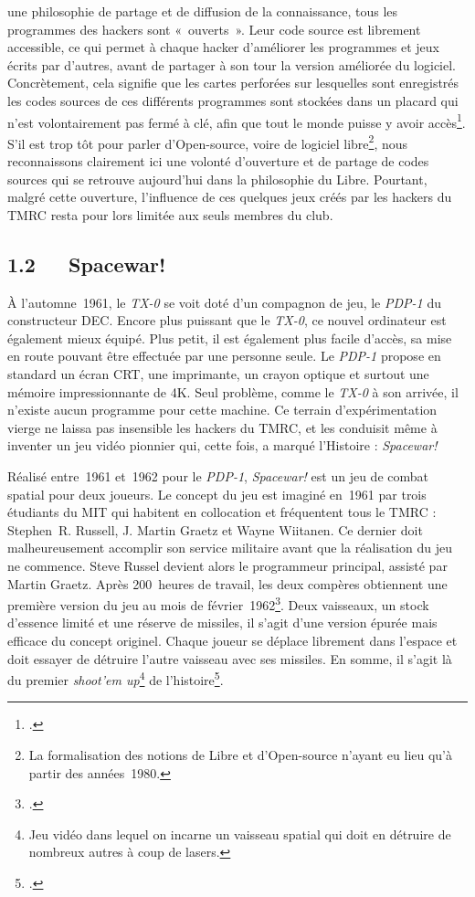 \documentclass{FramateX}
\begin{document}
\begin{refsection}
une philosophie de partage et de diffusion de la connaissance, tous les
programmes des hackers sont «~ouverts~». Leur code source est librement
accessible, ce qui permet à chaque hacker d'améliorer les programmes et
jeux écrits par d'autres, avant de partager à son tour la version
améliorée du logiciel. Concrètement, cela signifie que les cartes
perforées sur lesquelles sont enregistrés les codes sources de ces
différents programmes sont stockées dans un placard qui n'est
volontairement pas fermé à clé, afin que tout le monde puisse y avoir
accès\footnote{\cite{graetzorigin1981}.}. S'il est trop tôt pour parler d'Open-source,
voire de logiciel libre\footnote{La formalisation des notions de
Libre et d'Open-source n'ayant eu lieu qu'à partir des années~1980.},
nous reconnaissons clairement ici une volonté d'ouverture et de partage
de codes sources qui se retrouve aujourd'hui dans la philosophie du
Libre. Pourtant, malgré cette ouverture, l'influence de ces quelques
jeux créés par les hackers du TMRC resta pour lors limitée aux seuls
membres du club.

\subsection*{1.2~~~Spacewar!}
{}


À l'automne~1961, le \textit{TX-0} se voit
doté d'un compagnon de jeu, le \textit{PDP-1} du constructeur
DEC. Encore plus puissant que le \textit{TX-0},
ce nouvel ordinateur est également mieux équipé. Plus petit, il est
également plus facile d'accès, sa mise en route pouvant être effectuée
par une personne seule. Le \textit{PDP-1} propose en standard un écran
CRT, une imprimante, un crayon optique et surtout une mémoire
impressionnante de 4K. Seul problème, comme le \textit{TX-0} à son arrivée, il n'existe
aucun programme pour cette machine. Ce terrain d'expérimentation vierge
ne laissa pas insensible les hackers du TMRC, et les conduisit même à
inventer un jeu vidéo pionnier qui, cette fois, a marqué l'Histoire : \textit{Spacewar!}

Réalisé entre~1961 et~1962 pour le \textit{PDP-1}, \textit{Spacewar!} est un jeu de combat
spatial pour deux joueurs. Le concept du jeu est imaginé en~1961 par
trois étudiants du MIT qui habitent en collocation et fréquentent tous
le TMRC : Stephen~R. Russell, J. Martin Graetz et Wayne Wiitanen. Ce
dernier doit malheureusement accomplir son service militaire avant que
la réalisation du jeu ne commence. Steve Russel devient alors le
programmeur principal, assisté par Martin Graetz. Après 200~heures de
travail, les deux compères obtiennent une première version du jeu au
mois de février~1962\footnote{\cite{graetzorigin1981}.}. Deux vaisseaux, un stock d'essence
limité et une réserve de missiles, il s'agit d'une version épurée mais
efficace du concept originel. Chaque joueur se déplace librement dans
l'espace et doit essayer de détruire l'autre vaisseau avec ses
missiles. En somme, il s'agit là du
premier \textit{shoot'em up}\footnote{Jeu
vidéo dans lequel on incarne un vaisseau spatial qui doit en détruire
de nombreux autres à coup de lasers.} de l'histoire\footnote{\cite{kentultimate2001}.}. 


\end{refsection}
\end{document}
